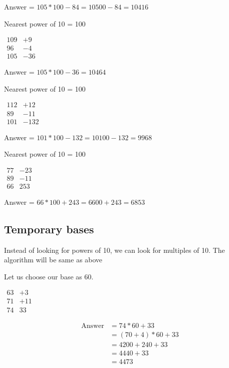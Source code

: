 Answer = $105 * 100 - 84 = 10500 - 84 = 10416$

Nearest power of 10 = 100

$
\begin{matrix}
    109 & +9 \\
    96 & -4 \\
    \hline
    105 & -36
\end{matrix}
$

Answer = $105 * 100 - 36 = 10464$

Nearest power of 10 = 100

$
\begin{matrix}
    112 & +12 \\
    89 & -11 \\
    \hline
    101 & -132
\end{matrix}
$

Answer = $101 * 100 - 132 = 10100 - 132 = 9968$

Nearest power of 10 = 100

$
\begin{matrix}
    77 & -23 \\
    89 & -11 \\
    \hline
    66 & 253
\end{matrix}
$

Answer = $66 * 100 + 243 = 6600 + 243 = 6853$

\subsection{Temporary bases}
Instead of looking for powers of 10, we can look for multiples of 10. The algorithm will be same as above

Let us choose our base as 60. 

$
\begin{matrix}
    63 & +3 \\
    71 & +11 \\
    \hline
    74 & 33
\end{matrix}
$

\begin{align*}
    \text{Answer} &= 74 * 60 + 33 \\
    &= (70 + 4) * 60 + 33 \\
    &= 4200 + 240 + 33 \\
    &= 4440 + 33 \\
    &= 4473
\end{align*}


